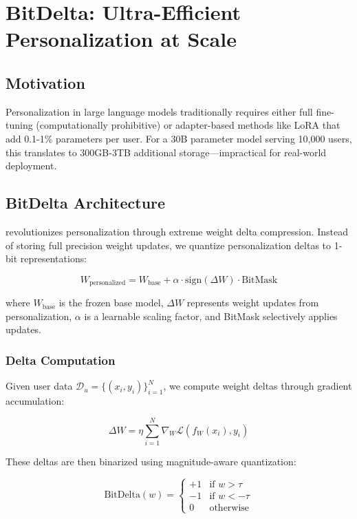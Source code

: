 \section{BitDelta: Ultra-Efficient Personalization at Scale}

\subsection{Motivation}

Personalization in large language models traditionally requires either full fine-tuning (computationally prohibitive) or adapter-based methods like LoRA that add 0.1-1\% parameters per user. For a 30B parameter model serving 10,000 users, this translates to 300GB-3TB additional storage—impractical for real-world deployment.

\subsection{BitDelta Architecture}

\bitdelta{} revolutionizes personalization through extreme weight delta compression. Instead of storing full precision weight updates, we quantize personalization deltas to 1-bit representations:

\begin{equation}
W_{\text{personalized}} = W_{\text{base}} + \alpha \cdot \text{sign}(\Delta W) \cdot \text{BitMask}
\end{equation}

where $W_{\text{base}}$ is the frozen base model, $\Delta W$ represents weight updates from personalization, $\alpha$ is a learnable scaling factor, and BitMask selectively applies updates.

\subsubsection{Delta Computation}

Given user data $\mathcal{D}_u = \{(x_i, y_i)\}_{i=1}^N$, we compute weight deltas through gradient accumulation:

\begin{equation}
\Delta W = \eta \sum_{i=1}^N \nabla_W \mathcal{L}(f_W(x_i), y_i)
\end{equation}

These deltas are then binarized using magnitude-aware quantization:

\begin{equation}
\text{BitDelta}(w) = \begin{cases}
+1 & \text{if } w > \tau \\
-1 & \text{if } w < -\tau \\
0 & \text{otherwise}
\end{cases}
\end{equation}

